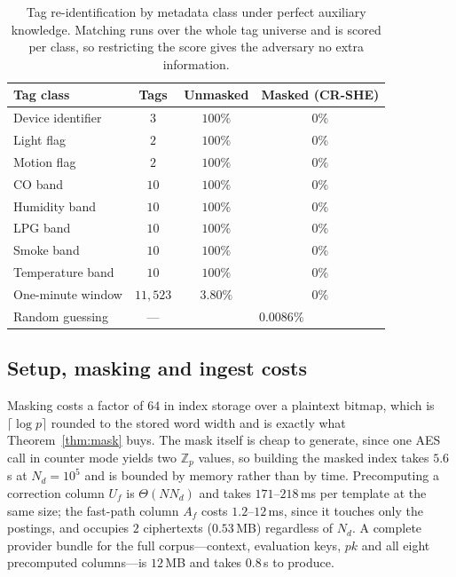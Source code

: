 \documentclass[journal]{IEEEtran}
\begin{document}
\begin{table}[t]
\centering
\caption{Tag re-identification by metadata class under perfect auxiliary
knowledge. Matching runs over the whole tag universe and is scored per class,
so restricting the score gives the adversary no extra information.}
\label{tab:leakage}
\footnotesize
\renewcommand{\arraystretch}{1.15}
\begin{tabular*}{\columnwidth}{@{\extracolsep{\fill}}lccc@{}}
\toprule
Tag class & Tags & Unmasked & Masked (CR-SHE) \\
\midrule
Device identifier      & $3$      & $100\%$ & $0\%$ \\
Light flag             & $2$      & $100\%$ & $0\%$ \\
Motion flag            & $2$      & $100\%$ & $0\%$ \\
CO band                & $10$     & $100\%$ & $0\%$ \\
Humidity band          & $10$     & $100\%$ & $0\%$ \\
LPG band               & $10$     & $100\%$ & $0\%$ \\
Smoke band             & $10$     & $100\%$ & $0\%$ \\
Temperature band       & $10$     & $100\%$ & $0\%$ \\
One-minute window      & $11{,}523$ & $3.80\%$ & $0\%$ \\
\midrule
Random guessing        & ---      & \multicolumn{2}{c}{$0.0086\%$} \\
\bottomrule
\end{tabular*}
\end{table}

\subsection{Setup, masking and ingest costs}
Masking costs a factor of $64$ in index storage over a plaintext bitmap, which
is $\lceil\log p\rceil$ rounded to the stored word width and is exactly what
Theorem~\ref{thm:mask} buys. The mask itself is cheap to generate, since one AES
call in counter mode yields two $\mathbb{Z}_p$ values, so building the masked
index takes $5.6$\,s at $N_d=10^5$ and is bounded by memory rather than by time.
Precomputing a correction column $U_f$ is $\Theta(N N_d)$ and takes
$171$--$218$\,ms per template at the same size; the fast-path column $A_f$ costs
$1.2$--$12$\,ms, since it touches only the postings, and occupies $2$
ciphertexts ($0.53$\,MB) regardless of $N_d$. A complete provider bundle for the
full corpus---context, evaluation keys, $pk$ and all eight precomputed
columns---is $12$\,MB and takes $0.8$\,s to produce.
\end{document}
